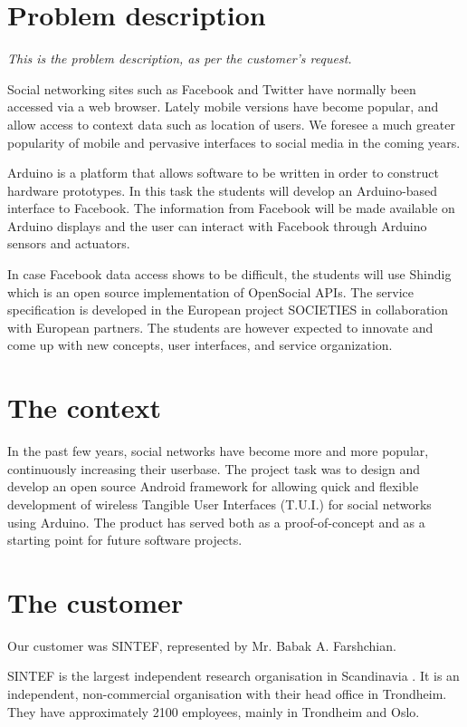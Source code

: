 \section{Problem description}

\emph{This is the problem description, as per the customer's request.}

Social networking sites such as Facebook and Twitter have normally been accessed  via a web browser.
Lately mobile versions have become popular, and allow access to context data such as location of
users. We foresee a much greater popularity of mobile and pervasive interfaces to social media in
the coming years.

Arduino\cite{link:arduino} is a platform that allows software to be written in order to construct
hardware prototypes. In this task the students will develop an Arduino-based interface to Facebook.
The information from Facebook will be made available on Arduino displays and the user can interact
with Facebook through Arduino sensors and actuators.

In case Facebook data access shows to be difficult, the students will use Shindig\cite{link:shinding} which 
is an open source implementation of OpenSocial APIs. The service specification is developed in the European project 
SOCIETIES in collaboration with European partners. The students are however expected to innovate and come up 
with new concepts, user interfaces, and service organization.

\section{The context}
In the past few years, social networks have become more and more popular, continuously increasing their userbase.
The project task was to design and develop an open source Android\cite{link:android} framework for allowing quick
and flexible development of wireless Tangible User Interfaces (T.U.I.) for social networks using Arduino.
The product has served both as a proof-of-concept and as a starting point for future software projects.

\section{The customer}
Our customer was SINTEF, represented by Mr. Babak A. Farshchian.

SINTEF is the largest independent research organisation in Scandinavia \cite{link:sintef}.
It is an independent, non-commercial organisation with their head office in Trondheim. They have approximately 2100 employees, mainly in Trondheim and Oslo.

